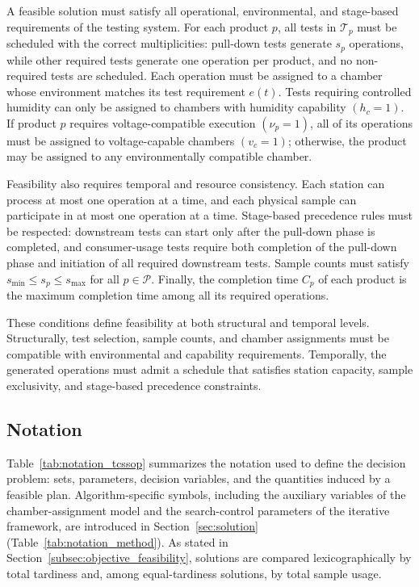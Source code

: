 \documentclass[11pt]{article}
\begin{document}
A feasible solution must satisfy all operational, environmental, and stage-based requirements of the testing system. For each product \(p\), all tests in \(\mathcal{T}_p\) must be scheduled with the correct multiplicities: pull-down tests generate \(s_p\) operations, while other required tests generate one operation per product, and no non-required tests are scheduled. Each operation must be assigned to a chamber whose environment matches its test requirement \(e(t)\). Tests requiring controlled humidity can only be assigned to chambers with humidity capability \((h_c=1)\). If product \(p\) requires voltage-compatible execution \((\nu_p=1)\), all of its operations must be assigned to voltage-capable chambers \((v_c=1)\); otherwise, the product may be assigned to any environmentally compatible chamber.

Feasibility also requires temporal and resource consistency. Each station can process at most one operation at a time, and each physical sample can participate in at most one operation at a time. Stage-based precedence rules must be respected: downstream tests can start only after the pull-down phase is completed, and consumer-usage tests require both completion of the pull-down phase and initiation of all required downstream tests. Sample counts must satisfy \(s_{\min}\le s_p\le s_{\max}\) for all \(p\in\mathcal{P}\). Finally, the completion time \(C_p\) of each product is the maximum completion time among all its required operations.

These conditions define feasibility at both structural and temporal levels. Structurally, test selection, sample counts, and chamber assignments must be compatible with environmental and capability requirements. Temporally, the generated operations must admit a schedule that satisfies station capacity, sample exclusivity, and stage-based precedence constraints.

\subsection{Notation}
\label{subsec:notation}

Table~\ref{tab:notation_tcssop} summarizes the notation used to define the decision problem: sets, parameters, decision variables, and the quantities induced by a feasible plan. Algorithm-specific symbols, including the auxiliary variables of the chamber-assignment model and the search-control parameters of the iterative framework, are introduced in Section~\ref{sec:solution} (Table~\ref{tab:notation_method}). As stated in Section~\ref{subsec:objective_feasibility}, solutions are compared lexicographically by total tardiness and, among equal-tardiness solutions, by total sample usage.
\end{document}
